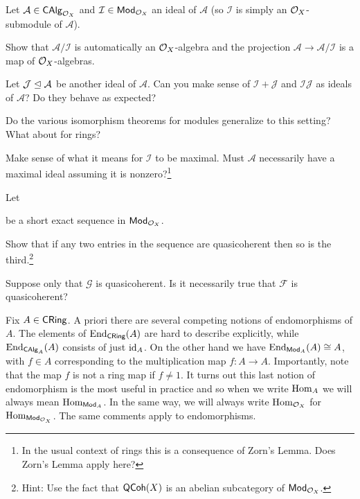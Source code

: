 \documentclass[11pt]{article}
\renewcommand{\AA}{\mathcal{A}}
\renewcommand{\F}{\mathcal{F}}
\newcommand{\G}{\mathcal{G}}
\newcommand{\I}{\mathcal{I}}
\newcommand{\J}{\mathcal{J}}
\begin{document}
\begin{exercise}
Let $\AA\in\CAlg_{\O_X}$ and $\I\in\Mod_{\O_X}$ an ideal of $\AA$ (so $\I$ is simply an $\mathcal{O}_X$-submodule of $\AA$).
\begin{enum}{\alph}
\item Show that $\AA/\I$ is automatically an $\mathcal{O}_X$-algebra and the projection $\AA\to\AA/\I$ is a map of $\mathcal{O}_X$-algebras.

\item Let $\J\normal\AA$ be another ideal of $\AA$. Can you make sense of $\I+\J$ and $\I\J$ as ideals of $\AA$? Do they behave as expected?

\item Do the various isomorphism theorems for modules generalize to this setting? What about for rings?

\item Make sense of what it means for $\I$ to be maximal. Must $\AA$ necessarily have a maximal ideal assuming it is nonzero?\footnote{In the usual context of rings this is a consequence of Zorn's Lemma. Does Zorn's Lemma apply here?}
\end{enum}
\end{exercise}

\begin{exercise}
Let 
\begin{center}
\end{center}
be a short exact sequence in $\operatorname{\mathsf{Mod}}_{\mathcal{O}_X}$.
\begin{enum}{\alph}
\item Show that if any two entries in the sequence are quasicoherent then so is the third.\footnote{Hint: Use the fact that $\operatorname{\mathsf{QCoh}}(X)$ is an abelian subcategory of $\operatorname{\mathsf{Mod}}_{\mathcal{O}_X}$.}

\item Suppose only that $\G$ is quasicoherent. Is it necessarily true that $\F$ is quasicoherent?
\end{enum}
\end{exercise}

Fix $A\in\operatorname{\mathsf{CRing}}$. A priori there are several competing notions of endomorphisms of $A$. The elements of $\operatorname{End}_{\operatorname{\mathsf{CRing}}}(A)$ are hard to describe explicitly, while $\operatorname{End}_{\operatorname{\mathsf{CAlg}}_A}(A)$ consists of just $\operatorname{id}_A$. On the other hand we have $\operatorname{End}_{\operatorname{\mathsf{Mod}}_A}(A)\cong A$, with $f\in A$ corresponding to the multiplication map $f: A\to A$. Importantly, note that the map $f$ is not a ring map if $f\neq1$. It turns out this last notion of endomorphism is the most useful in practice and so when we write $\operatorname{Hom}_A$ we will always mean $\operatorname{Hom}_{\operatorname{\mathsf{Mod}}_A}$. In the same way, we will always write $\operatorname{Hom}_{\mathcal{O}_X}$ for $\operatorname{Hom}_{\operatorname{\mathsf{Mod}}_{\mathcal{O}_X}}$. The same comments apply to endomorphisms.
\end{document}

